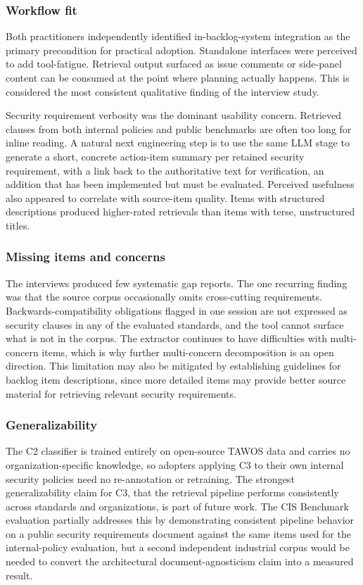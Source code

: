 \subsubsection*{Workflow fit}

Both practitioners independently identified in-backlog-system integration as the primary precondition for practical adoption.
Standalone interfaces were perceived to add tool-fatigue. Retrieval output surfaced as issue comments or side-panel content can be consumed at the point where planning actually happens.
This is considered the most consistent qualitative finding of the interview study.

Security requirement verbosity was the dominant usability concern. Retrieved clauses from both internal policies and public benchmarks are often too long for inline reading.
A natural next engineering step is to use the same LLM stage to generate a short, concrete action-item summary per retained security requirement, with a link back to the authoritative text for verification, an addition that has been implemented but must be evaluated.
Perceived usefulness also appeared to correlate with source-item quality. Items with structured descriptions produced higher-rated retrievals than items with terse, unstructured titles.


\subsubsection*{Missing items and concerns}

The interviews produced few systematic gap reports.
The one recurring finding was that the source corpus occasionally omits cross-cutting requirements. Backwards-compatibility obligations flagged in one session are not expressed as security clauses in any of the evaluated standards, and the tool cannot surface what is not in the corpus.
The extractor continues to have difficulties with multi-concern items, which is why further multi-concern decomposition is an open direction.
This limitation may also be mitigated by establishing guidelines for backlog item descriptions, since more detailed items may provide better source material for retrieving relevant security requirements.

\subsubsection*{Generalizability}
The C2 classifier is trained entirely on open-source TAWOS data and carries no organization-specific knowledge, so adopters applying C3 to their own internal security policies need no re-annotation or retraining.
The strongest generalizability claim for C3, that the retrieval pipeline performs consistently across standards and organizations, is part of future work.
The CIS Benchmark evaluation partially addresses this by demonstrating consistent pipeline behavior on a public security requirements document against the same items used for the internal-policy evaluation, but a second independent industrial corpus would be needed to convert the architectural document-agnosticism claim into a measured result.
